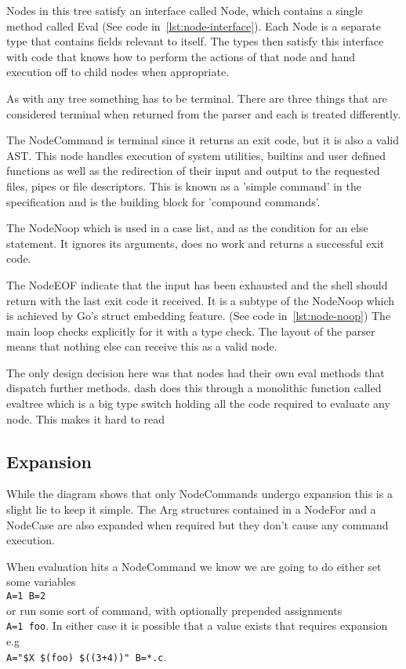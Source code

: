 Nodes in this tree satisfy an interface called Node, which contains a single method called Eval (See code in~\autoref{lst:node-interface}).
Each Node is a separate type that contains fields relevant to itself.
The types then satisfy this interface with code that knows how to perform the actions of that node and hand execution off to child nodes when appropriate.

As with any tree something has to be terminal.
There are three things that are considered terminal when returned from the parser and each is treated differently.

The NodeCommand is terminal since it returns an exit code, but it is also a valid AST.
This node handles execution of system utilities, builtins and user defined functions as well as the redirection of their input and output to the requested files, pipes or file descriptors.
This is known as a 'simple command' in the specification and is the building block for 'compound commands'.

The NodeNoop which is used in a case list, and as the condition for an else statement.
It ignores its arguments, does no work and returns a successful exit code.

The NodeEOF indicate that the input has been exhausted and the shell should return with the last exit code it received.
It is a subtype of the NodeNoop which is achieved by Go's struct embedding feature. (See code in~\autoref{lst:node-noop})
The main loop checks explicitly for it with a type check.
The layout of the parser means that nothing else can receive this as a valid node.

The only design decision here was that nodes had their own eval methods that dispatch further methods.
dash does this through a monolithic function called evaltree which is a big type switch holding all the code required to evaluate any node.
This makes it hard to read

\subsection{Expansion}
While the diagram shows that only NodeCommands undergo expansion this is a slight lie to keep it simple.
The Arg structures contained in a NodeFor and a NodeCase are also expanded when required but they don't cause any command execution.

When evaluation hits a NodeCommand we know we are going to do either set some variables \\ \verb!A=1 B=2!\\ or run some sort of command, with optionally prepended assignments \\ \verb!A=1 foo!.
In either case it is possible that a value exists that requires expansion e.g \\ \verb!A="$X $(foo) $((3+4))" B=*.c!.

